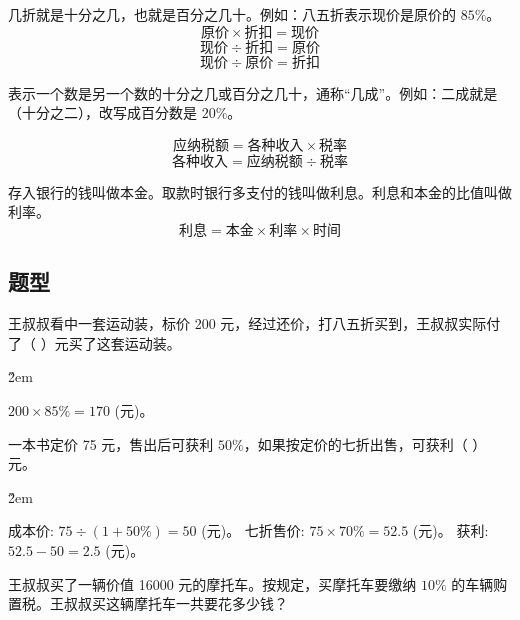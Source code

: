 \begin{definition}[折扣]
    几折就是十分之几，也就是百分之几十。例如：八五折表示现价是原价的 $85\%$。
    $$ \text{原价} \times \text{折扣} = \text{现价} $$
    $$ \text{现价} \div \text{折扣} = \text{原价} $$
    $$ \text{现价} \div \text{原价} = \text{折扣} $$
\end{definition}

\begin{definition}[成数]
    表示一个数是另一个数的十分之几或百分之几十，通称“几成”。例如：二成就是（十分之二），改写成百分数是 $20\%$。
\end{definition}

\begin{definition}[税率]
    $$ \text{应纳税额} = \text{各种收入} \times \text{税率} $$
    $$ \text{各种收入} = \text{应纳税额} \div \text{税率} $$
\end{definition}

\begin{definition}[利率]
    存入银行的钱叫做本金。取款时银行多支付的钱叫做利息。利息和本金的比值叫做利率。
    $$ \text{利息} = \text{本金} \times \text{利率} \times \text{时间} $$
\end{definition}

\subsection*{题型}

\begin{example}
    王叔叔看中一套运动装，标价 200 元，经过还价，打八五折买到，王叔叔实际付了（ \quad ）元买了这套运动装。
\end{example}

\v{2em}

\begin{solution}
    $200 \times 85\% = 170$ (元)。
\end{solution}

\begin{example}
    一本书定价 75 元，售出后可获利 $50\%$，如果按定价的七折出售，可获利（ \quad ）元。
\end{example}

\v{2em}

\begin{solution}
    成本价: $75 \div (1+50\%) = 50$ (元)。
    七折售价: $75 \times 70\% = 52.5$ (元)。
    获利: $52.5 - 50 = 2.5$ (元)。
\end{solution}

\begin{example}
    王叔叔买了一辆价值 16000 元的摩托车。按规定，买摩托车要缴纳 $10\%$ 的车辆购置税。王叔叔买这辆摩托车一共要花多少钱？
\end{example}

